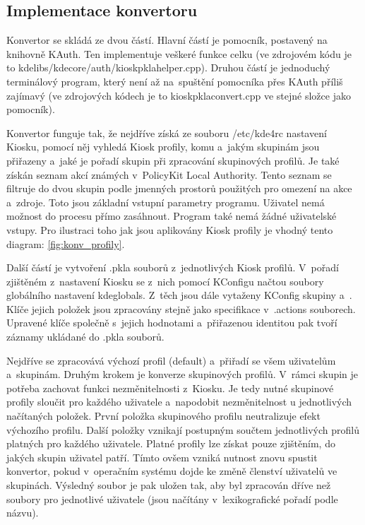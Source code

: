 \subsection*{Implementace konvertoru}
Konvertor se skládá ze dvou částí. Hlavní částí je pomocník, postavený na knihovně KAuth. Ten implementuje veškeré funkce celku (ve zdrojovém kódu je to kdelibs/kdecore/auth/kioskpklahelper.cpp). Druhou částí je jednoduchý terminálový program, který není až na~spuštění pomocníka přes KAuth příliš zajímavý (ve zdrojových kódech je to kioskpklaconvert.cpp ve stejné složce jako pomocník).

Konvertor funguje tak, že nejdříve získá ze souboru /etc/kde4rc nastavení Kiosku, pomocí něj vyhledá Kiosk profily, komu a~jakým skupinám jsou přiřazeny a~jaké je pořadí skupin při zpracování skupinových profilů. Je také získán seznam akcí známých v~PolicyKit Local Authority. Tento seznam se filtruje do dvou skupin podle jmenných prostorů použitých pro omezení na akce a~zdroje. Toto jsou základní vstupní parametry programu. Uživatel nemá možnost do procesu přímo zasáhnout. Program také nemá žádné uživatelské vstupy. Pro ilustraci toho jak jsou aplikovány Kiosk profily je vhodný tento diagram: \ref{fig:konv_profily}.

Další částí je vytvoření .pkla souborů z~jednotlivých Kiosk profilů. V~pořadí zjištěném z~nastavení Kiosku se z~nich pomocí KConfigu načtou soubory globálního nastavení kdeglobals. Z~těch jsou dále vytaženy KConfig skupiny  a~. Klíče jejich položek jsou zpracovány stejně jako specifikace v~.actions souborech. Upravené klíče společně s~jejich hodnotami a~přiřazenou identitou pak tvoří záznamy ukládané do .pkla souborů.

Nejdříve se zpracovává výchozí profil (default) a~přiřadí se všem uživatelům a~skupinám. Druhým krokem je konverze skupinových profilů. V~rámci skupin je potřeba zachovat funkci nezměnitelnosti z~Kiosku. Je tedy nutné skupinové profily sloučit pro každého uživatele a~napodobit nezměnitelnost u jednotlivých načítaných položek. První položka skupinového profilu neutralizuje efekt výchozího profilu. Další položky vznikají postupným součtem jednotlivých profilů platných pro každého uživatele. Platné profily lze získat pouze zjištěním, do jakých skupin uživatel patří. Tímto ovšem vzniká nutnost znovu spustit konvertor, pokud v~operačním systému dojde ke změně členství uživatelů ve skupinách. Výsledný soubor je pak uložen tak, aby byl zpracován dříve než soubory pro jednotlivé uživatele (jsou načítány v~lexikografické pořadí podle názvu).

